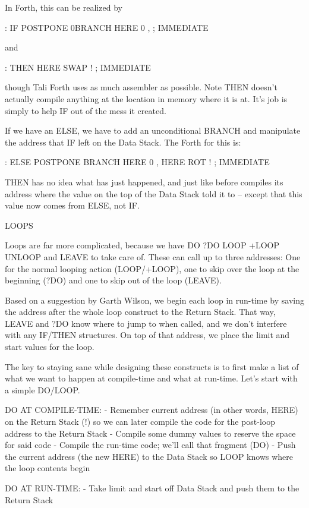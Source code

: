 In Forth, this can be realized by

: IF  POSTPONE 0BRANCH HERE 0 , ; IMMEDIATE

and 

: THEN  HERE SWAP ! ; IMMEDIATE

though Tali Forth uses as much assembler as possible. Note THEN doesn't
actually compile anything at the location in memory where it is at. It's job is
simply to help IF out of the mess it created. 

If we have an ELSE, we have to add an unconditional BRANCH and manipulate the
address that IF left on the Data Stack. The Forth for this is: 

: ELSE  POSTPONE BRANCH HERE 0 , HERE ROT ! ; IMMEDIATE

THEN has no idea what has just happened, and just like before compiles its
address where the value on the top of the Data Stack told it to -- except that
this value now comes from ELSE, not IF. 



LOOPS 

Loops are far more complicated, because we have DO ?DO LOOP +LOOP UNLOOP and
LEAVE to take care of. These can call up to three addresses: One for the normal
looping action (LOOP/+LOOP), one to skip over the loop at the beginning (?DO)
and one to skip out of the loop (LEAVE). 

Based on a suggestion by Garth Wilson, we begin each loop in run-time by saving
the address after the whole loop construct to the Return Stack. That way, LEAVE
and ?DO know where to jump to when called, and we don't interfere with any
IF/THEN structures. On top of that address, we place the limit and start values
for the loop. 

The key to staying sane while designing these constructs is to first make
a list of what we want to happen at compile-time and what at run-time. Let's
start with a simple DO/LOOP.


DO AT COMPILE-TIME: 
- Remember current address (in other words, HERE) on the Return Stack (!) so 
  we can later compile the code for the post-loop address to the Return Stack
- Compile some dummy values to reserve the space for said code
- Compile the run-time code; we'll call that fragment (DO)
- Push the current address (the new HERE) to the Data Stack so LOOP knows where 
  the loop contents begin

DO AT RUN-TIME: 
- Take limit and start off Data Stack and push them to the Return Stack

